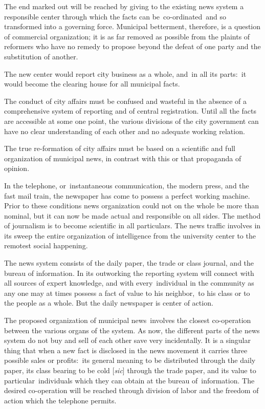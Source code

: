 \documentclass[twoside,symmetric,nobib,justified]{tufte-book}
\begin{document}
The end marked out will be reached by giving to the existing news system
a responsible center through which the facts can be~co-ordinated~and so
transformed into a governing force. Municipal betterment, therefore, is
a question of commercial organization; it is as far removed as possible
from the plaints of reformers who have no remedy to propose beyond the
defeat of one party and the substitution of another.~

The new center would report city business as a whole, and~in all its
parts:~it would become the clearing house for all municipal facts.~~

The conduct of city affairs must be confused and wasteful in the absence
of a comprehensive system of reporting and of central registration.
Until all the facts are accessible at some one point, the various
divisions of the city government can have no clear understanding of each
other and no adequate working relation.~

\newpage The true re-formation of city affairs must be based on a scientific and
full organization of municipal news, in contrast with this or that
propaganda of opinion.~

In the telephone, or~instantaneous communication, the modern press, and
the fast mail train, the newspaper has come to possess a perfect working
machine. Prior to these conditions news organization could not on the
whole be more than nominal, but it can now be made actual and
responsible on all sides. The method of journalism is to become
scientific in all particulars. The news traffic involves in its sweep
the entire organization of intelligence from the university center to
the remotest social happening.~

The news system consists of the daily paper, the trade or class journal,
and the bureau of information. In its outworking the reporting system
will connect with all sources of expert knowledge, and with
every~individual in the community as any one may at times possess a fact
of value to his neighbor,~to his class or to the people as a whole. But
the daily newspaper is center of action.~

The proposed organization of municipal news~involves the closest
co-operation between the various organs of the system. As now, the
different parts of the news system do not buy and sell of each other
save very incidentally. It is a singular thing that when a new fact is
disclosed in the news movement it carries three possible sales or
profits:~its general meaning to be distributed through the daily paper,
its class bearing to be cold {[}\emph{sic}{]} through the trade paper,
and its value to particular~individuals which they can obtain at the
bureau of~information. The desired co-operation will be reached through
division of labor and the freedom of action which the telephone
permits.~
\end{document}
